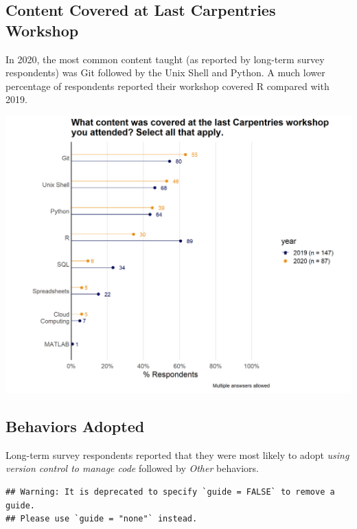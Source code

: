 \documentclass[
]{article}
\makeatletter
\def\maxwidth{\ifdim\Gin@nat@width>\linewidth\linewidth\else\Gin@nat@width\fi}
\makeatother
\begin{document}
\hypertarget{content-covered-at-last-carpentries-workshop}{%
\subsection{Content Covered at Last Carpentries
Workshop}\label{content-covered-at-last-carpentries-workshop}}

In 2020, the most common content taught (as reported by long-term survey
respondents) was Git followed by the Unix Shell and Python. A much lower
percentage of respondents reported their workshop covered R compared
with 2019.

\includegraphics[width=\maxwidth]{../figures/2020-12-longterm-workshop_attended_content-1}

\hypertarget{behaviors-adopted}{%
\subsection{Behaviors Adopted}\label{behaviors-adopted}}

Long-term survey respondents reported that they were most likely to
adopt \emph{using version control to manage code} followed by
\emph{Other} behaviors.

\begin{verbatim}
## Warning: It is deprecated to specify `guide = FALSE` to remove a guide.
## Please use `guide = "none"` instead.
\end{verbatim}
\end{document}
